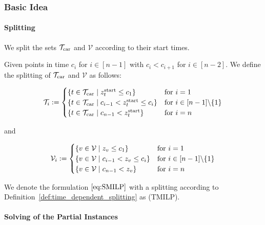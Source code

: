 \subsubsection{Basic Idea}
\label{sec:basic_idea}

\paragraph{Splitting} \parfill

We split the sets $\mathcal{T}_{\operatorname{car}}$ and $\mathcal{V}$ according to their start times.

\begin{definition}
\label{def:time_dependent_splitting}

Given points in time $c_i$ for $i\in[n-1]$ with $c_i<c_{i+1}$ for $i\in[n-2]$. We define the splitting of $\mathcal{T}_{\operatorname{car}}$ and $\mathcal{V}$ as follows:

\begin{align*}
	\mathcal{T}_i := \begin{cases}
		\left\{t\in\mathcal{T}_{\operatorname{car}}\mid z^{\operatorname{start}}_t\leq c_1\right\} & \text{for } i=1 \\
		\left\{t\in\mathcal{T}_{\operatorname{car}}\mid c_{i-1}<z^{\operatorname{start}}_t\leq c_i\right\} & \text{for } i\in[n-1]\backslash\{1\} \\
		\left\{t\in\mathcal{T}_{\operatorname{car}}\mid c_{n-1}<z^{\operatorname{start}}_t\right\} & \text{for } i=n
	\end{cases}
\end{align*}

and

\begin{align*}
	\mathcal{V}_i := \begin{cases}
		\left\{v\in\mathcal{V}\mid z_v\leq c_1\right\} & \text{for } i=1 \\
		\left\{v\in\mathcal{V}\mid c_{i-1}<z_v\leq c_i\right\} & \text{for } i\in[n-1]\backslash\{1\} \\
		\left\{v\in\mathcal{V}\mid c_{n-1}<z_v\right\} & \text{for } i=n
	\end{cases}
\end{align*}

\end{definition}

We denote the formulation $\eqref{eq:SMILP}$ with a splitting according to Definition~\ref{def:time_dependent_splitting} as (TMILP).

\paragraph{Solving of the Partial Instances} \parfill

